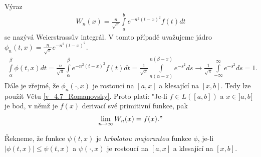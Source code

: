 \begin{priklad}\label{u_4.8_Weierstrassov_integral}
Výraz
\begin{align*}
W_n (x) = \frac{n}{\sqrt{\pi}} \int \limits_a^b e^{-n^2 (t-x)^2} f(t) dt
\end{align*}
se nazývá Weierstrassův integrál. V tomto případě uvažujeme jádro $\phi_n (t,x) = \frac{n}{\sqrt{\pi}} e^{-n^2 (t-x)^2}$.
\begin{align*}
\int \limits_\alpha^\beta \phi (t,x) dt = \frac{n}{\sqrt{\pi}} \int \limits_\alpha^\beta e^{-n^2 (t-x)^2} f(t) dt = \frac{1}{\sqrt{\pi}} \int \limits_{n(\alpha-x)}^{n(\beta-x)} e^{-s^2} ds \rightarrow \frac{1}{\sqrt{\pi}} \int \limits_{-\infty}^{\infty} e^{-s^2} ds = 1.
\end{align*}
Dále je zřejmé, že $\phi_n (\cdot, x)$ je rostoucí na $[a,x]$ a klesající na $[x,b]$. Tedy lze použít Větu \ref{v_4.7_Romanovsky}. Proto platí: "Je-li $f \in L([a,b])$ a $x \in ]a,b[$ je bod, v němž je $f(x)$ derivací své primitivní funkce, pak
\begin{align*}
\lim_{n \rightarrow \infty} W_n(x) = f(x)."
\end{align*}
\end{priklad}

\begin{definition}
\label{d_4.9}
Řekneme, že funkce $\psi (t,x)$ je \textit{hrbolatou majorantou} funkce $\phi$, je-li $|\phi (t,x)| \leq \psi (t,x)$ a $\psi (\cdot,x)$ je rostoucí na $[a,x]$ a klesající na $[x,b]$.
\end{definition}

